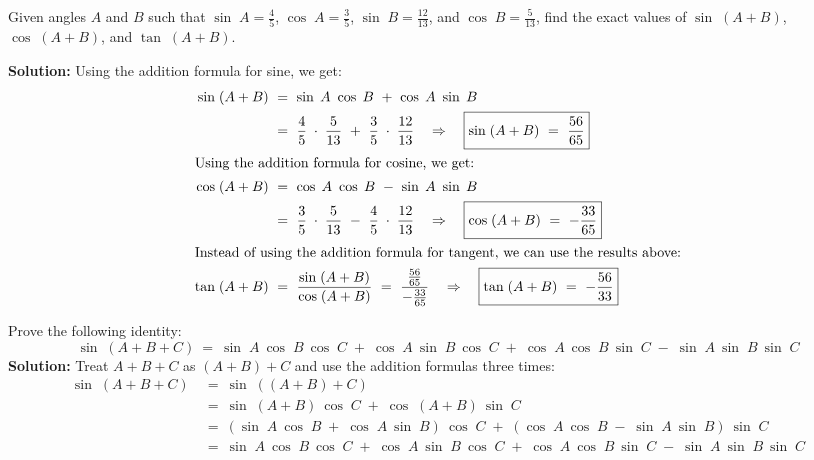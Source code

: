 \begin{exmp}\label{exmp:sumsincostan}
 Given angles $A$ and $B$ such that $\sin\;A = \frac{4}{5}$, $\cos\;A = \frac{3}{5}$,
 $\sin\;B = \frac{12}{13}$, and $\cos\;B = \frac{5}{13}$, find the exact values of $\sin\;(A+B)$,
 $\cos\;(A+B)$, and $\tan\;(A+B)$.\vspace{1mm}
 \par\noindent\textbf{Solution:} Using the addition formula for sine, we get:
 \begin{align*}
  \sin\;(A+B) ~&=~ \sin\;A ~ \cos\;B ~+~ \cos\;A ~ \sin\;B\\
  &=~ \frac{4}{5} \;\cdot\; \frac{5}{13} ~+~ \frac{3}{5} \;\cdot\; \frac{12}{13}
   \quad\Rightarrow\quad \boxed{\sin\;(A+B) ~=~ \frac{56}{65}}\\
  \intertext{Using the addition formula for cosine, we get:}
  \cos\;(A+B) ~&=~ \cos\;A ~ \cos\;B ~-~ \sin\;A ~ \sin\;B\\
  &=~ \frac{3}{5} \;\cdot\; \frac{5}{13} ~-~ \frac{4}{5} \;\cdot\; \frac{12}{13}
   \quad\Rightarrow\quad \boxed{\cos\;(A+B) ~=~ -\frac{33}{65}}\\
  \intertext{Instead of using the addition formula for tangent, we can use the results above:}
  \tan\;(A+B) ~&=~ \frac{\sin\;(A+B)}{\cos\;(A+B)}
  ~=~ \frac{\frac{56}{65}}{-\frac{33}{65}}
  \quad\Rightarrow\quad \boxed{\tan\;(A+B) ~=~ -\frac{56}{33}}
 \end{align*}
\end{exmp}\vspace{-1mm}
\divider\vspace{-2mm}
\newpage
\begin{exmp}\label{exmp:sumsinabc}
 Prove the following identity:
 \begin{displaymath}
  \sin\;(A+B+C) ~=~ \sin\;A~\cos\;B~\cos\;C \;+\; \cos\;A~\sin\;B~\cos\;C \;+\; 
                    \cos\;A~\cos\;B~\sin\;C \;-\; \sin\;A~\sin\;B~\sin\;C
 \end{displaymath}
 \textbf{Solution:} Treat $A+B+C$ as $(A+B)+C$ and use the addition formulas three times:
 \begin{align*}
  \sin\;(A+B+C) ~&=~ \sin\;((A+B)+C)\\
  &=~ \sin\;(A+B)~\cos\;C \;+\; \cos\;(A+B)~\sin\;C\\
  &=~ (\sin\;A ~ \cos\;B \;+\; \cos\;A ~ \sin\;B)~\cos\;C \;+\;
      (\cos\;A ~ \cos\;B \;-\; \sin\;A ~ \sin\;B)~\sin\;C\\
  &=~ \sin\;A~\cos\;B~\cos\;C \;+\; \cos\;A~\sin\;B~\cos\;C \;+\; 
      \cos\;A~\cos\;B~\sin\;C \;-\; \sin\;A~\sin\;B~\sin\;C
 \end{align*}
\end{exmp}\vspace{-5mm}
